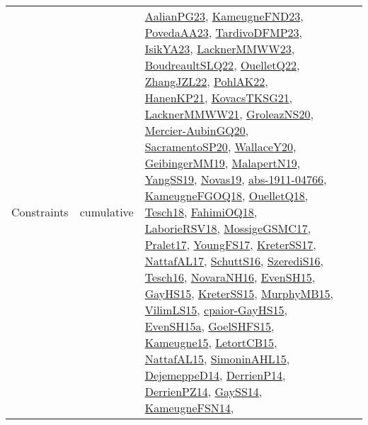 {\begin{longtable}{llp{6cm}p{6cm}p{6cm}}
Constraints & cumulative & \href{papers/AalianPG23.pdf}{AalianPG23}\cite{AalianPG23}, \href{papers/KameugneFND23.pdf}{KameugneFND23}\cite{KameugneFND23}, \href{papers/PovedaAA23.pdf}{PovedaAA23}\cite{PovedaAA23}, \href{papers/TardivoDFMP23.pdf}{TardivoDFMP23}\cite{TardivoDFMP23}, \href{articles/IsikYA23.pdf}{IsikYA23}\cite{IsikYA23}, \href{articles/LacknerMMWW23.pdf}{LacknerMMWW23}\cite{LacknerMMWW23}, \href{papers/BoudreaultSLQ22.pdf}{BoudreaultSLQ22}\cite{BoudreaultSLQ22}, \href{papers/OuelletQ22.pdf}{OuelletQ22}\cite{OuelletQ22}, \href{papers/ZhangJZL22.pdf}{ZhangJZL22}\cite{ZhangJZL22}, \href{articles/PohlAK22.pdf}{PohlAK22}\cite{PohlAK22}, \href{papers/HanenKP21.pdf}{HanenKP21}\cite{HanenKP21}, \href{papers/KovacsTKSG21.pdf}{KovacsTKSG21}\cite{KovacsTKSG21}, \href{papers/LacknerMMWW21.pdf}{LacknerMMWW21}\cite{LacknerMMWW21}, \href{papers/GroleazNS20.pdf}{GroleazNS20}\cite{GroleazNS20}, \href{papers/Mercier-AubinGQ20.pdf}{Mercier-AubinGQ20}\cite{Mercier-AubinGQ20}, \href{articles/SacramentoSP20.pdf}{SacramentoSP20}\cite{SacramentoSP20}, \href{articles/WallaceY20.pdf}{WallaceY20}\cite{WallaceY20}, \href{papers/GeibingerMM19.pdf}{GeibingerMM19}\cite{GeibingerMM19}, \href{papers/MalapertN19.pdf}{MalapertN19}\cite{MalapertN19}, \href{papers/YangSS19.pdf}{YangSS19}\cite{YangSS19}, \href{articles/Novas19.pdf}{Novas19}\cite{Novas19}, \href{articles/abs-1911-04766.pdf}{abs-1911-04766}\cite{abs-1911-04766}, \href{papers/KameugneFGOQ18.pdf}{KameugneFGOQ18}\cite{KameugneFGOQ18}, \href{papers/OuelletQ18.pdf}{OuelletQ18}\cite{OuelletQ18}, \href{papers/Tesch18.pdf}{Tesch18}\cite{Tesch18}, \href{articles/FahimiOQ18.pdf}{FahimiOQ18}\cite{FahimiOQ18}, \href{articles/LaborieRSV18.pdf}{LaborieRSV18}\cite{LaborieRSV18}, \href{papers/MossigeGSMC17.pdf}{MossigeGSMC17}\cite{MossigeGSMC17}, \href{papers/Pralet17.pdf}{Pralet17}\cite{Pralet17}, \href{papers/YoungFS17.pdf}{YoungFS17}\cite{YoungFS17}, \href{articles/KreterSS17.pdf}{KreterSS17}\cite{KreterSS17}, \href{articles/NattafAL17.pdf}{NattafAL17}\cite{NattafAL17}, \href{papers/SchuttS16.pdf}{SchuttS16}\cite{SchuttS16}, \href{papers/SzerediS16.pdf}{SzerediS16}\cite{SzerediS16}, \href{papers/Tesch16.pdf}{Tesch16}\cite{Tesch16}, \href{articles/NovaraNH16.pdf}{NovaraNH16}\cite{NovaraNH16}, \href{papers/EvenSH15.pdf}{EvenSH15}\cite{EvenSH15}, \href{papers/GayHS15.pdf}{GayHS15}\cite{GayHS15}, \href{papers/KreterSS15.pdf}{KreterSS15}\cite{KreterSS15}, \href{papers/MurphyMB15.pdf}{MurphyMB15}\cite{MurphyMB15}, \href{papers/VilimLS15.pdf}{VilimLS15}\cite{VilimLS15}, \href{papers/cpaior-GayHS15.pdf}{cpaior-GayHS15}\cite{cpaior-GayHS15}, \href{articles/EvenSH15a.pdf}{EvenSH15a}\cite{EvenSH15a}, \href{articles/GoelSHFS15.pdf}{GoelSHFS15}\cite{GoelSHFS15}, \href{articles/Kameugne15.pdf}{Kameugne15}\cite{Kameugne15}, \href{articles/LetortCB15.pdf}{LetortCB15}\cite{LetortCB15}, \href{articles/NattafAL15.pdf}{NattafAL15}\cite{NattafAL15}, \href{articles/SimoninAHL15.pdf}{SimoninAHL15}\cite{SimoninAHL15}, \href{papers/DejemeppeD14.pdf}{DejemeppeD14}\cite{DejemeppeD14}, \href{papers/DerrienP14.pdf}{DerrienP14}\cite{DerrienP14}, \href{papers/DerrienPZ14.pdf}{DerrienPZ14}\cite{DerrienPZ14}, \href{papers/GaySS14.pdf}{GaySS14}\cite{GaySS14}, \href{articles/KameugneFSN14.pdf}{KameugneFSN14}\cite{KameugneFSN14}, 
\end{longtable}}
